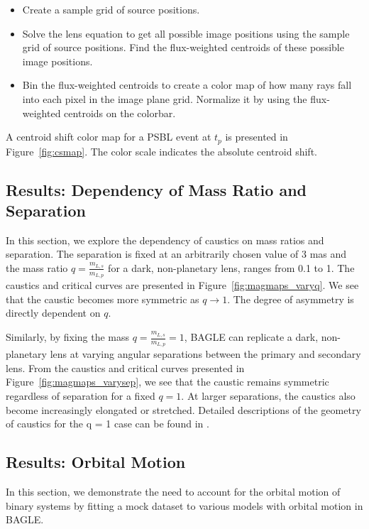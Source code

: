 \documentclass[twocolumn]{aastex701}
\begin{document}
\begin{itemize}
    \item Create a sample grid of source positions. 
    \item Solve the lens equation to get all possible image positions using the sample grid of source positions. Find the flux-weighted centroids of these possible image positions.
    \item Bin the flux-weighted centroids to create a color map of how many rays fall into each pixel in the image plane grid. Normalize it by using the flux-weighted centroids on the colorbar. 
\end{itemize}

A centroid shift color map for a PSBL event at $t_p$ is presented in Figure~\ref{fig:csmap}. The color scale indicates the absolute centroid shift.



\subsection{Results: Dependency of Mass Ratio and Separation}
\label{sec:results_q}
In this section, we explore the dependency of caustics on mass ratios and separation. The separation is fixed at an arbitrarily chosen value of 3 mas and the mass ratio $q=\frac{m_{L,s}}{m_{L,p}}$ for a dark, non-planetary lens, ranges from 0.1 to 1. The caustics and critical curves are presented in Figure~\ref{fig:magmaps_varyq}. We see that the caustic becomes more symmetric as $q \rightarrow 1$. The degree of asymmetry is directly dependent on $q$. 

Similarly, by fixing the mass  $q=\frac{m_{L,s}}{m_{L,p}} = 1$, BAGLE can replicate a dark, non-planetary lens at varying angular separations between the primary and secondary lens. From the caustics and critical curves presented in Figure~\ref{fig:magmaps_varysep}, we see that the caustic remains symmetric regardless of separation for a fixed $q=1$. At larger separations, the caustics also become increasingly elongated or stretched. Detailed descriptions of the geometry of caustics for the q = 1 case can be found in \cite{Schneider_1986}.  


\subsection{Results: Orbital Motion}
\label{sec:results_om}

In this section, we demonstrate the need to account for the orbital motion of binary systems by fitting a mock dataset to various models with orbital motion in BAGLE. 
\end{document}
